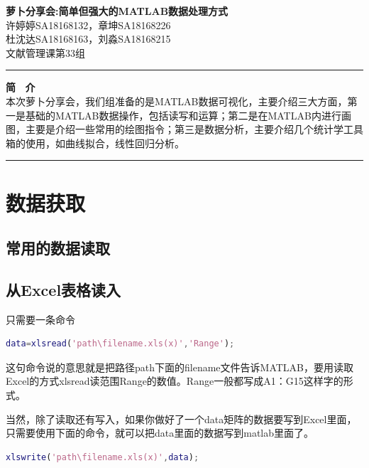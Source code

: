 \documentclass{hfutpaper}
\begin{document}
\begin{center}
\LARGE
  \textbf{萝卜分享会:简单但强大的MATLAB数据处理方式}\\
  \vspace{0.2em}
  \large
    许婷婷SA18168132，章坤SA18168226\\
    杜沈达SA18168163，刘淼SA18168215 \\ %
    文献管理课第33组
  \end{center}
\rule[0.1\baselineskip]{\textwidth}{0.5pt}
\textbf{简 \ 介}\\
\large
本次萝卜分享会，我们组准备的是MATLAB数据可视化，主要介绍三大方面，第一是基础的MATLAB数据操作，包括读写和运算；第二是在MATLAB内进行画图，主要是介绍一些常用的绘图指令；第三是数据分析，主要介绍几个统计学工具箱的使用，如曲线拟合，线性回归分析。
\\
\rule[0.1\baselineskip]{\textwidth}{0.5pt}
\section{数据获取}
\subsection{常用的数据读取}
\subsection*{从Excel表格读入}
只需要一条命令
\begin{lstlisting}[language=matlab]
data=xlsread('path\filename.xls(x)','Range');
\end{lstlisting}
这句命令说的意思就是把路径path下面的filename文件告诉MATLAB，要用读取Excel的方式xlsread读范围Range的数值。Range一般都写成A1：G15这样字的形式。

当然，除了读取还有写入，如果你做好了一个data矩阵的数据要写到Excel里面，只需要使用下面的命令，就可以把data里面的数据写到matlab里面了。
\begin{lstlisting}[language=matlab]
	xlswrite('path\filename.xls(x)',data);
\end{lstlisting}
\end{document}
